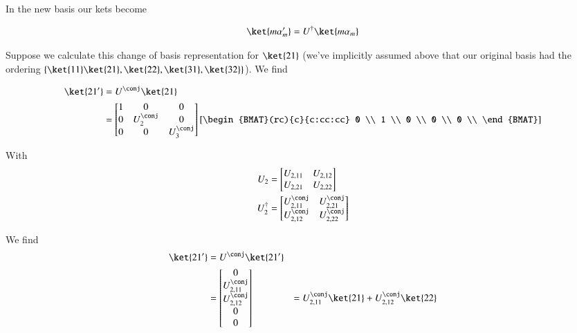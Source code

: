 In the new basis our kets become

\begin{equation}\label{eqn:pertubationDegeneracy:350}
\ket{m \alpha_m'} = U^\dagger \ket{m \alpha_m}
\end{equation}

Suppose we calculate this change of basis representation for $\ket{21}$ (we've implicitly assumed above that our original basis had the ordering $\{ \ket{11} \ket{21}, \ket{22}, \ket{31}, \ket{32} \}$).  We find

\begin{align*}
\ket{21'} 
&= U^\conj \ket{21} \\
&=
\begin{bmatrix}
1 & 0 & 0 \\
0 & U_2^\conj & 0 \\
0 & 0 & U_3^\conj 
\end{bmatrix}
\left[
\begin{BMAT}(rc){c}{c:cc:cc}
0 \\
1 \\
0 \\
0 \\
0 \\
\end{BMAT}
\right]
\end{align*}

With 
\begin{align}\label{eqn:pertubationDegeneracy:370}
U_2
&=
\begin{bmatrix}
U_{2,11} & U_{2,12} \\
U_{2,21} & U_{2,22}
\end{bmatrix} \\
U_2^\dagger 
&=
\begin{bmatrix}
U_{2,11}^\conj & U_{2,21}^\conj \\
U_{2,12}^\conj & U_{2,22}^\conj
\end{bmatrix}
\end{align}

We find
\begin{equation}\label{eqn:pertubationDegeneracy:390}
\begin{aligned}
\ket{21'} 
&= U^\conj \ket{21'} \\
&=
\begin{bmatrix}
0 \\
U_{2,11}^\conj  \\
U_{2,12}^\conj  \\
0  \\
0
\end{bmatrix}
&=
U_{2,11}^\conj \ket{21} + 
U_{2,12}^\conj \ket{22}
\end{aligned}
\end{equation}

